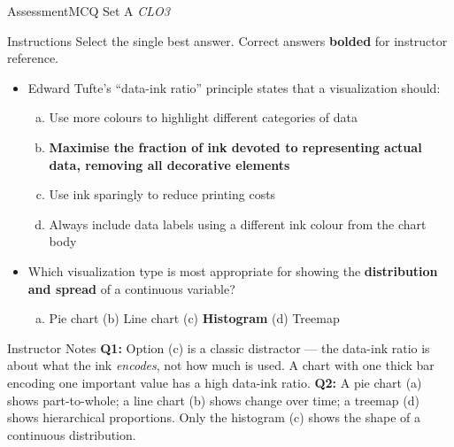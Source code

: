 \documentclass[aspectratio=169,10pt]{beamer}
\begin{document}
\begin{frame}{Assessment\textemdash MCQ Set A \hfill\small\textit{CLO3}}
  \begin{exampleblock}{Instructions}
    Select the single best answer.  Correct answers \textbf{bolded} for instructor reference.
  \end{exampleblock}
  \vspace{8pt}
  \begin{itemize}
    \item[\textbf{Q1.}] Edward Tufte's ``data-ink ratio'' principle states that a visualization should:
    \begin{enumerate}[(a)]
      \item Use more colours to highlight different categories of data
      \item \textbf{Maximise the fraction of ink devoted to representing actual data, removing all decorative elements}
      \item Use ink sparingly to reduce printing costs
      \item Always include data labels using a different ink colour from the chart body
    \end{enumerate}
  \end{itemize}
  \vspace{8pt}
  \begin{itemize}
    \item[\textbf{Q2.}] Which visualization type is most appropriate for showing the \textbf{distribution and spread} of a continuous variable?
    \begin{enumerate}[(a)]
      \item Pie chart \quad (b) Line chart \quad (c) \textbf{Histogram} \quad (d) Treemap
    \end{enumerate}
  \end{itemize}
  \vspace{8pt}
  \begin{alertblock}{Instructor Notes}
    \textbf{Q1:} Option (c) is a classic distractor --- the data-ink ratio is about what the ink \textit{encodes}, not how much is used.  A chart with one thick bar encoding one important value has a high data-ink ratio.  \textbf{Q2:} A pie chart (a) shows part-to-whole; a line chart (b) shows change over time; a treemap (d) shows hierarchical proportions.  Only the histogram (c) shows the shape of a continuous distribution.
  \end{alertblock}
\end{frame}
\end{document}
